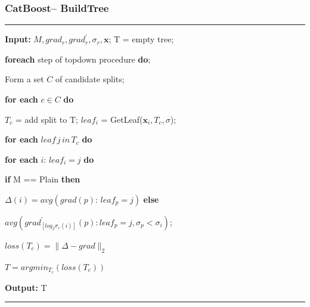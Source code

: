 \documentclass[usenames,dvipsnames]{beamer}
\begin{document}
\begin{frame}
\frametitle{CatBoost-- BuildTree}
\noindent\rule[0.10\baselineskip]{\textwidth}{0.5pt}
\textbf{Input:} $M, grad_r, grad_r^{'},\sigma_r, \textbf{x}$; T = empty tree;\par
    \hspace*{12pt} \textbf{foreach} step of topdown procedure \textbf{do};\par
    \hspace*{28pt} Form a set $C$ of candidate splits;\par
    \hspace*{28pt} \textbf{for each} $c\in C$ \textbf{do}\par
    \hspace*{44pt} $T_c$ = add split to T; $leaf_i$ = GetLeaf($\textbf{x}_i, T_c, \sigma$);\par
    \hspace*{44pt} \textbf{for each} $leaf\,j\,in\,T_c$ \textbf{do}\par
    \hspace*{60pt} \textbf{for each} $i:\, leaf_i = j$ \textbf{do}\par
    \hspace*{76pt} \textbf{if} M == Plain \textbf{then}\par
    \hspace*{92pt} $\Delta(i) = avg(grad(p):\, leaf_p = j)$ \textbf{else}\par
    \hspace*{92pt} $avg(grad_{[log_2\sigma_r(i)]}^{'}(p):leaf_p = j, \sigma_p<\sigma_i)$;\par
    \hspace*{60pt} $loss(T_c) = \|\Delta-grad\|_2$\par
    \hspace*{44pt} $T = argmin_{T_c}(loss(T_c))$\par
\textbf{Output:} T\\
\noindent\rule[0.10\baselineskip]{\textwidth}{0.5pt}
\end{frame}
\end{document}
